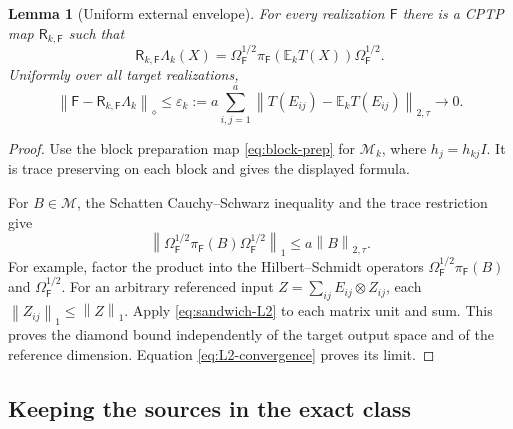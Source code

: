 \documentclass[11pt,reqno]{amsart}
\newtheorem{lemma}[theorem]{Lemma}
\theoremstyle{definition}
\theoremstyle{remark}
\numberwithin{equation}{section}
\newcommand{\M}{\mathcal M}
\newcommand{\F}{\mathsf F}
\newcommand{\R}{\mathsf R}
\newcommand{\norm}[1]{\left\lVert#1\right\rVert}
\begin{document}
\begin{lemma}[Uniform external envelope]\label{lem:external-envelope}
For every realization $\F$ there is a CPTP map $\R_{k,\F}$ such that
\[
 \R_{k,\F}\Lambda_k(X)
 =\Omega_\F^{1/2}\pi_\F(\mathbb E_kT(X))\Omega_\F^{1/2}.
\]
Uniformly over all target realizations,
\begin{equation}\label{eq:uniform-error}
 \norm{\F-\R_{k,\F}\Lambda_k}_\diamond
 \le\varepsilon_k:={a}\sum_{i,j=1}^a
 \norm{T(E_{ij})-\mathbb E_kT(E_{ij})}_{2,\tau}
 \longrightarrow0.
\end{equation}
\end{lemma}

\begin{proof}
Use the block preparation map \eqref{eq:block-prep} for $\M_k$, where $h_j=h_{kj}I$. It is trace preserving on each block and gives the displayed formula.

For $B\in\M$, the Schatten Cauchy--Schwarz inequality and the trace restriction give
\begin{equation}\label{eq:sandwich-L2}
 \norm{\Omega_\F^{1/2}\pi_\F(B)\Omega_\F^{1/2}}_1
 \le a\norm B_{2,\tau}.
\end{equation}
For example, factor the product into the Hilbert--Schmidt operators $\Omega_\F^{1/2}\pi_\F(B)$ and $\Omega_\F^{1/2}$. For an arbitrary referenced input $Z=\sum_{ij}E_{ij}\otimes Z_{ij}$, each $\norm{Z_{ij}}_1\le\norm Z_1$. Apply \eqref{eq:sandwich-L2} to each matrix unit and sum. This proves the diamond bound independently of the target output space and of the reference dimension. Equation \eqref{eq:L2-convergence} proves its limit.
\end{proof}

\subsection{Keeping the sources in the exact class}
\end{document}
